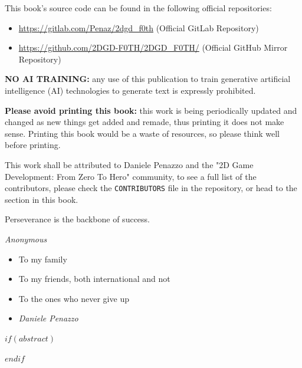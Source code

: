 \documentclass{article}
\begin{document}
This book's source code can be found in the following official repositories:

\begin{itemize}
    \item \url{https://gitlab.com/Penaz/2dgd_f0th} (Official GitLab Repository)
    \item \url{https://github.com/2DGD-F0TH/2DGD_F0TH/} (Official GitHub Mirror Repository)
\end{itemize}

\vspace{24pt}

\textbf{NO AI TRAINING:} any use of this publication to train generative artificial intelligence (AI) technologies to generate text is expressly prohibited.

\vspace{24pt}

\textbf{Please avoid printing this book:} this work is being periodically updated and changed as new things get added and remade, thus printing it does not make sense. Printing this book would be a waste of resources, so please think well before printing.

\vspace{24pt}

This work shall be attributed to Daniele Penazzo and the "2D Game Development: From Zero To Hero" community, to see a full list of the contributors, please check the \texttt{CONTRIBUTORS} file in the repository, or head to the  section in this book.

\clearpage

\clearpage
\null
\vfill
\begin{minipage}[b]{\textwidth}
\epigraph{Perseverance is the backbone of success.}{\textit{Anonymous}}
\addvspace{200 pt}
\begin{itemize}[label={}]
    \item To my family
    \item To my friends, both international and not
    \item To the ones who never give up
    \item \textit{Daniele Penazzo}
\end{itemize}
\end{minipage}
\vfill
\cleardoublepage
\pagestyle{fancy}
\normalsize
$if(abstract)$
\begin{abstract}
$abstract$
\end{abstract}
$endif$
\end{document}
